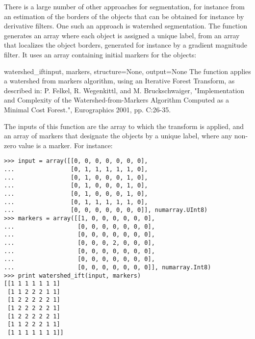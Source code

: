 There is a large number of other approaches for segmentation, for instance 
from an estimation of the borders of the objects that can be obtained for 
instance by derivative filters. One such an approach is watershed 
segmentation.  The function  generates an array 
where each object is assigned a unique label, from an array that localizes 
the object borders, generated for instance by a gradient magnitude filter. 
It uses an array containing initial markers for the objects:
\begin{funcdesc}{watershed_ift}{input, markers, structure=None, 
  output=None} The  function applies a watershed 
  from markers algorithm, using an Iterative Forest Transform, as described 
  in: P. Felkel, R.  Wegenkittl, and M. Bruckschwaiger, "Implementation and 
  Complexity of the Watershed-from-Markers Algorithm Computed as a Minimal 
  Cost Forest.", Eurographics 2001, pp. C:26-35.
  
  The inputs of this function are the array to which the transform is 
  applied, and an array of markers that designate the objects by a unique 
  label, where any non-zero value is a marker. For instance:
\begin{verbatim}
>>> input = array([[0, 0, 0, 0, 0, 0, 0],
...                [0, 1, 1, 1, 1, 1, 0],
...                [0, 1, 0, 0, 0, 1, 0],
...                [0, 1, 0, 0, 0, 1, 0],
...                [0, 1, 0, 0, 0, 1, 0],
...                [0, 1, 1, 1, 1, 1, 0],
...                [0, 0, 0, 0, 0, 0, 0]], numarray.UInt8)
>>> markers = array([[1, 0, 0, 0, 0, 0, 0],
...                  [0, 0, 0, 0, 0, 0, 0],
...                  [0, 0, 0, 0, 0, 0, 0],
...                  [0, 0, 0, 2, 0, 0, 0],
...                  [0, 0, 0, 0, 0, 0, 0],
...                  [0, 0, 0, 0, 0, 0, 0],
...                  [0, 0, 0, 0, 0, 0, 0]], numarray.Int8)
>>> print watershed_ift(input, markers)
[[1 1 1 1 1 1 1]
 [1 1 2 2 2 1 1]
 [1 2 2 2 2 2 1]
 [1 2 2 2 2 2 1]
 [1 2 2 2 2 2 1]
 [1 1 2 2 2 1 1]
 [1 1 1 1 1 1 1]]
\end{verbatim}
  

\end{funcdesc}
